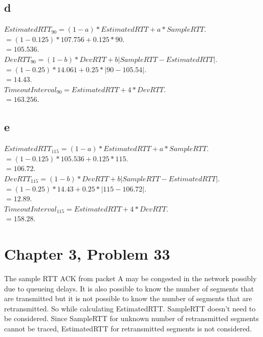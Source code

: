\documentclass{article}
\begin{document}
\subsection*{d}  $EstimatedRTT_{90} = (1-a)*EstimatedRTT + a * SampleRTT$.\\
\newline $= (1-0.125) * 107.756 + 0.125*90$.\\
\newline $= 105.536$.\\
\newline $DevRTT_{90} = (1-b) * DevRTT + b | SampleRTT -EstimatedRTT|$.\\
\newline $= (1-0.25) * 14.061 + 0.25 * |90-105.54|$.\\
\newline $= 14.43$.\\
\newline $TimeoutInterval_{90} = EstimatedRTT + 4 * DevRTT$.\\
\newline $= 163.256$.\\

\subsection*{e}  $EstimatedRTT_{115} = (1-a)*EstimatedRTT + a * SampleRTT$.\\
\newline $= (1-0.125) * 105.536 + 0.125*115$.\\
\newline $= 106.72$.\\
\newline $DevRTT_{115} = (1-b) * DevRTT + b | SampleRTT -EstimatedRTT|$.\\
\newline $= (1-0.25) * 14.43 + 0.25 * |115-106.72|$.\\
\newline $= 12.89$.\\
\newline $TimeoutInterval_{115} = EstimatedRTT + 4 * DevRTT$.\\
\newline $= 158.28$.\\

\section*{Chapter 3, Problem 33}
The sample RTT ACK from packet A may be congested in the network possibly due to queueing delays.  It is also possible to know the number of segments that are transmitted but it is not possible to know the number of segments that are retransmitted.  So while calculating EstimatedRTT. SampleRTT doesn't need to be considered. Since SampleRTT for unknown number of retransmitted segments cannot be traced, EstimatedRTT for retransmitted segments is not considered.\\
\end{document}
